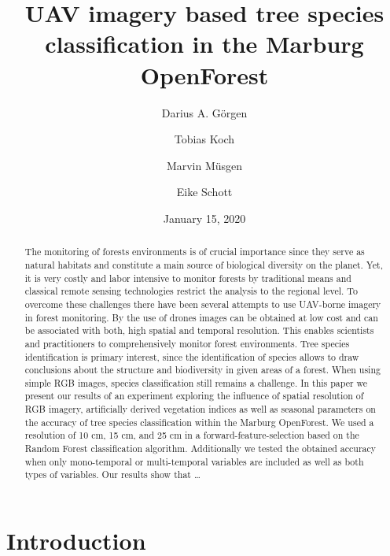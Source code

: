 \documentclass[]{article}
\title{UAV imagery based tree species classification in the Marburg OpenForest}
\author{Darius A. Görgen \and Tobias Koch \and Marvin Müsgen \and Eike Schott}
\date{January 15, 2020}
\begin{document}
\maketitle
\begin{abstract}
The monitoring of forests environments is of crucial importance since
they serve as natural habitats and constitute a main source of
biological diversity on the planet. Yet, it is very costly and labor
intensive to monitor forests by traditional means and classical remote
sensing technologies restrict the analysis to the regional level. To
overcome these challenges there have been several attempts to use
UAV-borne imagery in forest monitoring. By the use of drones images can
be obtained at low cost and can be associated with both, high spatial
and temporal resolution. This enables scientists and practitioners to
comprehensively monitor forest environments. Tree species identification
is primary interest, since the identification of species allows to draw
conclusions about the structure and biodiversity in given areas of a
forest. When using simple RGB images, species classification still
remains a challenge. In this paper we present our results of an
experiment exploring the influence of spatial resolution of RGB imagery,
artificially derived vegetation indices as well as seasonal parameters
on the accuracy of tree species classification within the Marburg
OpenForest. We used a resolution of 10 cm, 15 cm, and 25 cm in a
forward-feature-selection based on the Random Forest classification
algorithm. Additionally we tested the obtained accuracy when only
mono-temporal or multi-temporal variables are included as well as both
types of variables. Our results show that \ldots{}
\end{abstract}

{
\setcounter{tocdepth}{2}
\tableofcontents
}
\hypertarget{introduction}{%
\section{Introduction}\label{introduction}}
\end{document}
